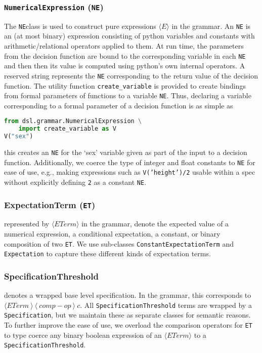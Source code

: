 \newcommand{\NE}{\texttt{NE}}
\subsubsection{\texttt{NumericalExpression} (\NE)}
The \NE class is used to construct pure expressions $\langle E \rangle$ in the grammar.
An \NE{} is an (at most binary) expression consisting of python variables and constants with arithmetic/relational operators applied to them.
At run time, the parameters from the decision function are bound to the corresponding variable in each \NE{} and then then its value is computed using python's own internal operators. 
A reserved string represents the \NE{} corresponding to the return value of the decision function.
The utility function \texttt{create\_variable} is provided to create bindings from formal parameters of functions to a variable \NE. 
Thus, declaring a variable corresponding to a formal parameter of a decision function is as simple as 
\begin{lstlisting}[language=python]
from dsl.grammar.NumericalExpression \
    import create_variable as V
V("sex")
\end{lstlisting}

\noindent this creates an \NE{} for the `sex' variable given as part of the input to a decision function. 
Additionally, we coerce the type of integer and float constants to \NE{} for ease of use, e.g., making expressions such as \texttt{V('height')/2} usable within a spec without explicitly defining \texttt{2} as a constant \NE{}. 

\newcommand{\ET}{\texttt{ET}}
\subsubsection{ExpectationTerm (\ET)}
represented by $\langle ETerm \rangle$ in the grammar, denote the expected value of a numerical expression, a conditional expectation, a constant, or binary composition of two \ET{}.
We use sub-classes \texttt{ConstantExpectationTerm} and \texttt{Expectation} to capture these different kinds of expectation terms. 

\subsubsection{SpecificationThreshold} denotes a wrapped base level specification.
In the grammar, this corresponds to $\langle ETerm\ \rangle\ \langle\ comp-op\ \rangle\ c$. 
All \texttt{SpecificationThreshold} terms are wrapped by a\\ \texttt{Specification}, but we maintain these as separate classes for semantic reasons. 
To further improve the ease of use, we overload the comparison operators for \ET{} to type coerce any binary boolean expression of an $\langle ETerm \rangle$ to a \texttt{SpecificationThreshold}.  

